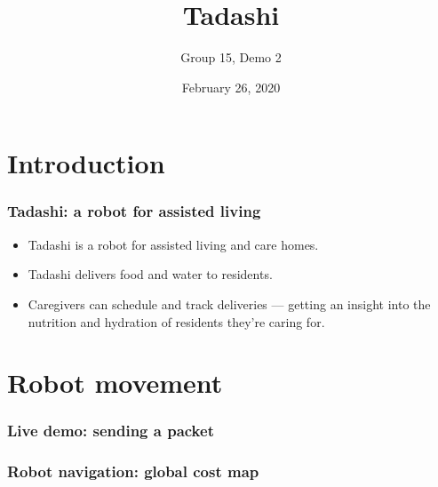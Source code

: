 \documentclass{beamer}
\title{Tadashi}
\subtitle{Group 15, Demo 2}
\institute{\vspace{2em}\texttt{[image: figs/logo.png]}}
\date{February 26, 2020}
\begin{document}
\maketitle
\section{Introduction}
\begin{frame}
  \frametitle{Tadashi: a robot for assisted living}
  \begin{itemize}
    \item Tadashi is a robot for assisted living and care homes.
    \item Tadashi delivers food and water to residents.
    \item Caregivers can schedule and track deliveries --- getting an insight into the nutrition and hydration of residents they're caring for.
  \end{itemize}
\end{frame}

\section{Robot movement}
\begin{frame}
  \frametitle{Live demo: sending a packet}
\end{frame}

\begin{frame}
  \frametitle{Robot navigation: global cost map}
\end{frame}
\end{document}
